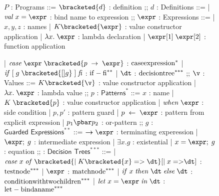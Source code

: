 \documentclass[manuscript,screen,review, 12pt]{acmart}
\begin{document}

\begin{figure}[h!p]
    \small
    \begin{flushleft}
        \begin{bnf}
        $P$ : \textsf{Programs} ::=
        $\bracketed{d}$ : definition
        ;;
        $d$ : \textsf{Definitions} ::=
        | $\mathit{val}\; x\; \mathit{=}\; \expr$ : bind name to expression
        ;;
        $\expr$ : Expressions ::= 
        | $x, y, z$              : names
        | $K\bracketed{\expr}$   : value constructor application 
        | $\lambda x.\; \expr$  : lambda declaration  
        | $\expr[1]\; \expr[2]$ : function application 
    
        | $\mathit{case}\; \expr\; \bracketed{p\; \rightarrow\; \expr}$ : $\rm{case expression}^{*}$
        | $\mathit{if}\; \mathit{[}\; g\; 
            \bracketed{[] g}\; \mathit{]}\; \mathit{fi}$                   : $\rm{if-fi}^{**}$
        | $\dt$ : $\rm{decision tree}^{***}$
        ;;
        $\v$ : Values ::= 
          $K\bracketed{\v}$     : value constructor application 
        | $\lambda x.\; \expr$ : lambda value 
        ;;
        $p$ : $\textsf{Patterns}^{*}$ ::= 
        $x$ : name 
        | $K\; \bracketed{p}$          : value constructor application 
        | $\mathit{when}\; \expr$       : side condition
        | $p, p'$                       : pattern guard 
        | $p\; \leftarrow\; \expr$    : pattern from explicit expression  
        | $p_{1}\pbar p_{2}$            : or-pattern
        ;;
        $g$ : $\textsf{Guarded Expressions}^{**}$ ::=  
        $\boldsymbol{\rightarrow}\expr$ : terminating experession
        | $\expr;\; g$                 : intermediate expression 
        | $\exists x \mathit{.} g$      : existential 
        | $x = \expr;\; g$             : equation 
        ;;
        \dt : $\textsf{Decision Trees}^{***}$ ::= 
        | $\mathit{case}\; x\; \mathit{of}\; 
            \bracketed{\vert\; K\bracketed{x}\; \mathit{=>}\; \dt} 
            [\vert\; x\; \mathit{=>} \dt]$                                 : $\rm{test node }^{***}$
        | $\expr$                                                           : $\rm{match node }^{***}$
        | $\mathit{if}\; x\; \mathit{then}\; \dt\; \mathit{else}\; \dt$  : $\rm{condition with two children }^{***}$
        | $\mathit{let}\; x\; \mathit{=}\; \expr\; \mathit{in}\; \dt$   : $\rm{let-bind a name}^{***}$
        \end{bnf}
        \medskip
        

\end{flushleft}
\end{figure}
\end{document}
